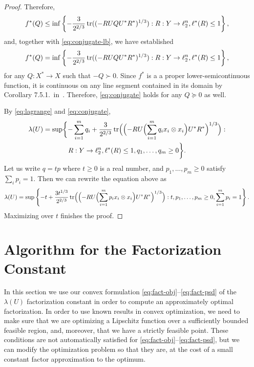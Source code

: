 \begin{proof}
  Therefore,
  \[
    f^*(Q) \le
    \inf\left\{ -\frac{3}{2^{2/3}} \operatorname{tr}((-RUQU^*R^*)^{1/3}):
    R:Y \to \ell_2^n,\ell^*(R) \le 1\right\},
  \]
  and, together with \eqref{eq:conjugate-lb}, we have established 
  \begin{equation}
    \label{eq:conjugate}
    f^*(Q) =
    \inf\left\{ -\frac{3}{2^{2/3}} \operatorname{tr}((-RUQU^*R^*)^{1/3}):
    R:Y \to \ell_2^n,\ell^*(R) \le 1\right\},
  \end{equation}
  for any $Q:X^*\to X$ such that $-Q \succ 0$. Since $f^*$ is a
  a proper lower-semicontinuous function, it is continuous on any
  line segment contained in its domain by Corollary
  7.5.1.~in~\cite{Rockafellar}. Therefore, \eqref{eq:conjugate}
  holds for any $Q \succeq 0$ as well. 
  
  By \eqref{eq:lagrange} and \eqref{eq:conjugate}, 
  \begin{multline}
  \lambda(U) = 
  \sup \biggl\{-\sum_{i = 1}^m{q_i} 
  + \frac{3}{2^{2/3}} \operatorname{tr}\Bigl(\Bigl(-RU\Bigl(\sum_{i = 1}^m{q_i  x_i\otimes  x_i}\Bigr)U^*R^*\Bigr)^{1/3}\Bigr):\\
  R:Y \to \ell_2^n,\ell^*(R) \le 1,
  q_1, \ldots, q_m \ge 0\biggr\}.
  \end{multline}
  Let us write $q = tp$ where $t \ge 0$ is a real number, and $p_1,
  \ldots, p_m \ge 0$ satisfy $\sum_i p_i = 1$. Then we can rewrite the
  equation above as
  \[
  \lambda(U) = 
  \sup\left\{-t + 
    \frac{3t^{1/3}}{2^{2/3}} \operatorname{tr}\Bigl(\Bigl(-RU\Bigl(\sum_{i = 1}^m{p_i  x_i\otimes x_i}\Bigr)U^*R^*\Bigr)^{1/3}\Bigr):
    t, p_1, \ldots, p_m \ge 0, \sum_{i=1}^m p_i = 1\right\}.
  \]
  Maximizing over $t$ finishes the proof. 
\end{proof}

\section{Algorithm for the Factorization Constant}
\label{sect:fact-alg}

In this section we use our convex formulation
\eqref{eq:fact-obj}--\eqref{eq:fact-psd} of the $\lambda(U)$
factorization constant in order to compute an approximately optimal
factorization. In order to use known results in convex optimization,
we need to make sure that we are optimizing a Lipschitz function over
a sufficiently bounded feasible region, and, moreover, that we have a
strictly feasible point. These conditions are not automatically
satisfied for \eqref{eq:fact-obj}--\eqref{eq:fact-psd}, but we can
modify the optimization problem so that they are, at the cost of a
small constant factor approximation to the optimum. 

